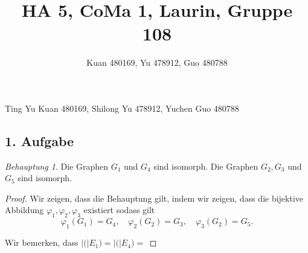 \documentclass[a5paper]{article}
\title{HA 5, CoMa 1, Laurin, Gruppe 108}
\author{Kuan 480169, Yu 478912, Guo 480788}
\providecommand{\abs}[1]{\left\lvert#1\right\rvert}
\theoremstyle{remark}
\newtheorem*{Behauptung}{Behauptung}
\begin{document}
\maketitle
\begin{center}
Ting Yu Kuan 480169, Shilong Yu 478912, Yuchen Guo 480788
\end{center}
\subsection{1. Aufgabe}
\begin{Behauptung}
  Die Graphen \(G_{1}\) und \(G_{4}\) sind isomorph.  Die Graphen \(G_{2},
  G_{3}\) und \(G_{5}\) sind isomorph.
\end{Behauptung}
\begin{proof}
  Wir zeigen, dass die Behauptung gilt, indem wir zeigen, dass die
  bijektive Abbildung \(\varphi_{1}, \varphi_{2}, \varphi_{3}\) existiert sodass gilt
  \[\varphi_{1}(G_{1}) = G_{4}, \quad \varphi_{2}(G_{2}) = G_{3}, \quad \varphi_{3}(G_{2}) =
    G_{5}.\]

  Wir bemerken, dass \(\abs(E_{1}) = \abs(E_{4}) = \)
\end{proof}
\end{document}
